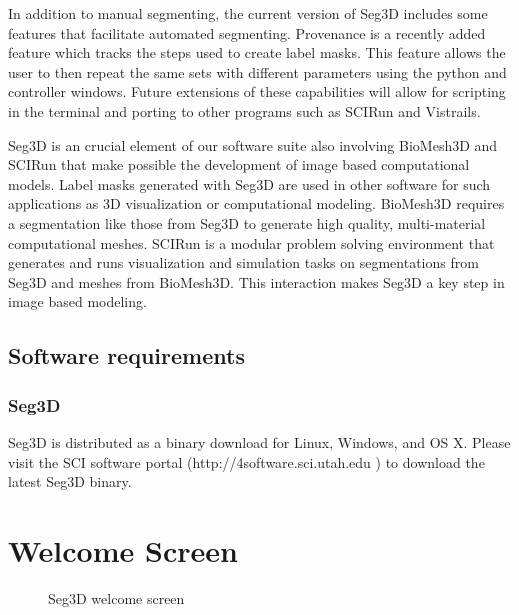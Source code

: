 \documentclass[fleqn,11pt,openany]{book}
\begin{document}
In addition to manual segmenting, the current version of Seg3D includes some features that facilitate automated segmenting.  Provenance is a recently added feature which tracks the steps used to create label masks.  This feature allows the user to then repeat the same sets with different parameters using the python and controller windows.  Future extensions of these capabilities will allow for scripting in the terminal and porting to other programs such as SCIRun and Vistrails.

Seg3D is an crucial element of our software suite also involving BioMesh3D and SCIRun that make possible the development of image based computational models.  Label masks generated with Seg3D are used in other software  for such applications as 3D visualization or computational modeling.  BioMesh3D requires a segmentation like those from Seg3D to generate high quality, multi-material computational meshes.  SCIRun is a modular problem solving environment that generates and runs visualization and simulation tasks on segmentations from Seg3D and meshes from BioMesh3D.  This interaction makes Seg3D a key step in image based modeling.

\section{Software requirements}

\subsection{Seg3D \SegthreeDVersion}

Seg3D is distributed as a binary download for Linux, Windows, and OS X. Please visit the SCI software portal ({http://4software.sci.utah.edu} ) to download the latest Seg3D binary. 



\chapter{Welcome Screen}

\begin{figure}
\caption{Seg3D welcome screen}\label{fig:welcome}
\end{figure}
\end{document}
